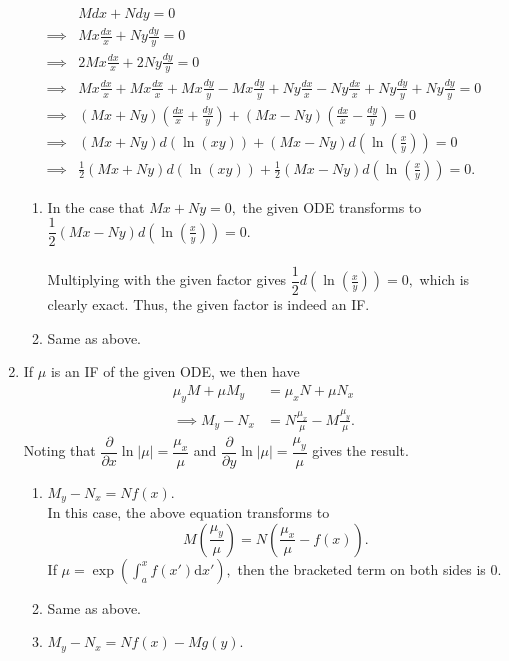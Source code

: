 \documentclass{article}
\begin{document}
\begin{enumerate}[label = Q.\arabic*.]
\begin{align*}
		& Mdx + Ndy = 0\\
		\implies & Mx\frac{dx}{x} + Ny\frac{dy}{y} = 0\\
		\implies & 2Mx\frac{dx}{x} + 2Ny\frac{dy}{y} = 0\\
		\implies & Mx\frac{dx}{x} + Mx\frac{dx}{x} + Mx\frac{dy}{y} - Mx\frac{dy}{y} + Ny\frac{dx}{x} - Ny\frac{dx}{x} + Ny\frac{dy}{y} + Ny\frac{dy}{y} = 0\\
		\implies & (Mx + Ny)\left(\frac{dx}{x} + \frac{dy}{y}\right) + (Mx - Ny)\left(\frac{dx}{x} - \frac{dy}{y}\right) = 0\\
		\implies & (Mx + Ny)d(\ln(xy)) + (Mx - Ny)d\left(\ln\left(\frac{x}{y}\right)\right) = 0\\
		\implies & \frac{1}{2}(Mx + Ny)d(\ln(xy)) + \frac{1}{2}(Mx - Ny)d\left(\ln\left(\frac{x}{y}\right)\right) = 0.		 
	\end{align*}
	\begin{enumerate}[label = (\roman*)] 
		\item In the case that $Mx + Ny = 0,$ the given ODE transforms to $\dfrac{1}{2}(Mx - Ny)d\left(\ln\left(\frac{x}{y}\right)\right) = 0.$\\~\\
		Multiplying with the given factor gives $\dfrac{1}{2}d\left(\ln\left(\frac{x}{y}\right)\right) = 0,$ which is clearly exact. Thus, the given factor is indeed an IF.
		\item Same as above.
	\end{enumerate}
	\item If $\mu$ is an IF of the given ODE, we then have
	\begin{align*} 
		\mu_yM + \mu M_y &= \mu_xN + \mu N_x\\
		\implies M_y - N_x &= N\frac{\mu_x}{\mu} - M\frac{\mu_y}{\mu}.
	\end{align*}
	Noting that $\dfrac{\partial}{\partial x}\ln|\mu| = \dfrac{\mu_x}{\mu}$ and $\dfrac{\partial}{\partial y}\ln|\mu| = \dfrac{\mu_y}{\mu}$ gives the result.\\
	\begin{enumerate}[label = (\alph*)] 
		\item $M_y - N_x = Nf(x).$\\
		In this case, the above equation transforms to
		\[M\left(\frac{\mu_y}{\mu}\right) = N\left(\frac{\mu_x}{\mu} - f(x)\right).\]
		If $\mu = \exp\left(\displaystyle\int_{a}^{x} f(x') \text{d}x'\right),$ then the bracketed term on both sides is $0.$
		\item Same as above.
		\item $M_y - N_x = Nf(x) - Mg(y).$\\

\end{enumerate}
\end{enumerate}
\end{document}
